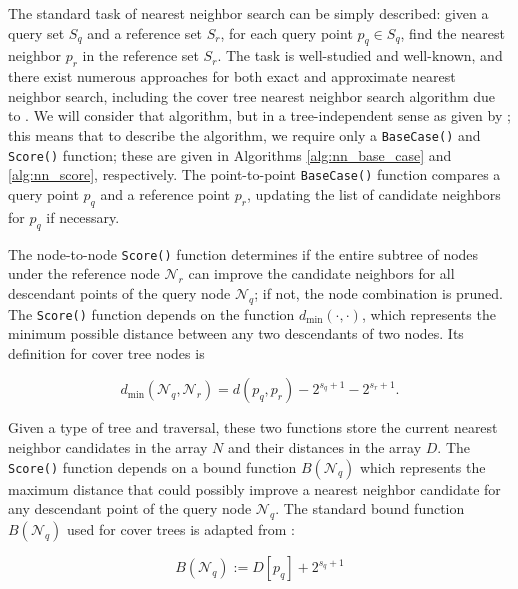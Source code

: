 The standard task of nearest neighbor search can be simply described: given a
query set $S_q$ and a reference set $S_r$, for each query point $p_q \in S_q$,
find the nearest neighbor $p_r$ in the reference set $S_r$.  The task is
well-studied and well-known, and there exist numerous approaches for both exact
and approximate nearest neighbor search, including the cover tree nearest
neighbor search algorithm due to \citet{langford2006}.  We will consider that
algorithm, but in a tree-independent sense as given by \citet{curtin2013tree};
this means that to describe the algorithm, we require only a \texttt{BaseCase()}
and \texttt{Score()} function; these are given in Algorithms
\ref{alg:nn_base_case} and \ref{alg:nn_score}, respectively.  The
point-to-point \texttt{BaseCase()} function compares a query point $p_q$ and a
reference point $p_r$, updating the list of candidate neighbors for $p_q$ if
necessary.

The node-to-node \texttt{Score()} function determines if the entire
subtree of nodes under the reference node $\mathscr{N}_r$ can improve the
candidate neighbors for all descendant points of the query node $\mathscr{N}_q$;
if not, the node combination is pruned.  The \texttt{Score()} function depends
on the function $d_{\min}(\cdot, \cdot)$, which represents the minimum possible
distance between any two descendants of two nodes.  Its definition for cover
tree nodes is

\begin{equation}
d_{\min}(\mathscr{N}_q, \mathscr{N}_r) = d(p_q, p_r) - 2^{s_q + 1} - 2^{s_r +
1}.
\end{equation}

Given a type of tree and traversal, these two functions store the current
nearest neighbor candidates in the array $N$ and their distances in the array
$D$. \citep[See][for a more complete
discussion of how this algorithm works and a proof of
correctness.]{curtin2013tree}  The
\texttt{Score()} function depends on a bound function $B(\mathscr{N}_q)$ which
represents the maximum distance that could possibly improve a nearest neighbor
candidate for any descendant point of the query node $\mathscr{N}_q$.  The
standard bound function $B(\mathscr{N}_q)$ used for cover trees is adapted from
\citep{langford2006}:

\begin{equation}
B(\mathscr{N}_q) := D[p_q] + 2^{s_q + 1}
\end{equation}


